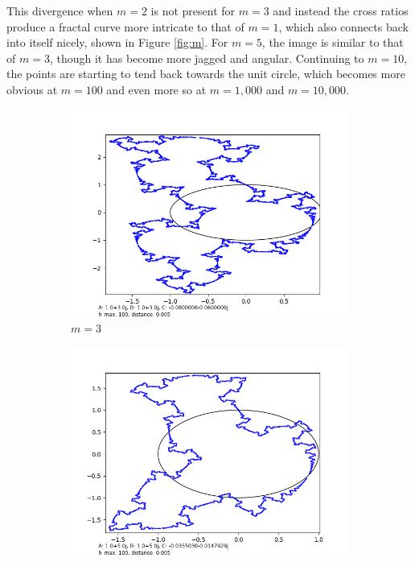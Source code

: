 \documentclass[12pt,a4paper,reqno,parskip=full]{amsart}
\numberwithin{equation}{section}
\theoremstyle{plain}
\theoremstyle{definition}
\begin{document}
This divergence when $m=2$ is not present for $m=3$ and instead the cross ratios produce a fractal curve more intricate to that of $m=1$, which also connects back into itself nicely, shown in Figure \ref{fig:m}. For $m=5$, the image is similar to that of $m=3$, though it has become more jagged and angular. Continuing to $m=10$, the points are starting to tend back towards the unit circle, which becomes more obvious at $m=100$ and even more so at $m=1,000$ and $m=10,000$.

\begin{figure}
     \centering
     
     \begin{subfigure}[b]{0.3\textwidth}
         \centering
         \includegraphics[width=\textwidth]{images/m/a3,b3,h100,d.005.png}
         \caption{$m=3$}
         \label{fig:m3}
     \end{subfigure}
     \hfill
     \begin{subfigure}[b]{0.3\textwidth}
         \centering
         \includegraphics[width=\textwidth]{images/m/a5,b5,h100,d.005.png}

\end{subfigure}
\end{figure}
\end{document}
